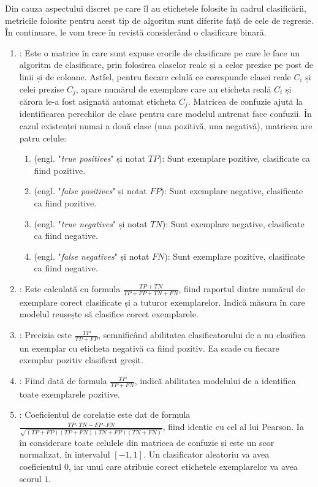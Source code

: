 \documentclass[../../main.tex]{subfiles}
\begin{document}
Din cauza aspectului discret pe care îl au etichetele folosite în cadrul clasifică\-rii, metricile folosite pentru acest tip de algoritm sunt diferite față de cele de regresie. În continuare, le vom trece în revistă considerând o clasificare binară.

\begin{enumerate}
    \item {}: Este o matrice în care sunt expuse erorile de clasificare pe care le face un algoritm de clasificare, prin folosirea claselor reale și a celor prezise pe post de linii și de coloane. Astfel, pentru fiecare celulă ce corespunde clasei reale $ C_i $ și celei prezise $ C_j $, apare numărul de exemplare care au eticheta reală $ C_i $ și cărora le-a fost asignată automat eticheta $ C_j $. Matricea de confuzie ajută la identificarea perechilor de clase pentru care modelul antrenat face confuzii. În cazul existenței numai a două clase (una pozitivă, una negativă), matricea are patru celule:
    \begin{enumerate}
        \item {} (engl. "\textit{true positives}" și notat $ TP $): Sunt exemplare pozitive, clasificate ca fiind pozitive.
        \item {} (engl. "\textit{false positives}" și notat $ FP $): Sunt exemplare negative, clasificate ca fiind pozitive.
        \item {} (engl. "\textit{true negatives}" și notat $ TN $): Sunt exemplare negative, clasificate ca fiind negative.
        \item {} (engl. "\textit{false negatives}" și notat $ FN $): Sunt exemplare pozitive, clasificate ca fiind negative.
    \end{enumerate}
    \item {}: Este calculată cu formula $ \frac{TP + TN}{TP + FP + TN + FN} $, fiind raportul dintre numărul de exemplare corect clasificate și a tuturor exemplarelor. Indică măsura în care modelul reușește să clasifice corect exemplarele.
    \item {}: Precizia este $ \frac{TP}{TP+FP} $, semnificând abilitatea clasificatorului de a nu clasifica un exemplar cu eticheta negativă ca fiind pozitiv. Ea scade cu fiecare exemplar pozitiv clasificat greșit.
    \item {}: Fiind dată de formula $ \frac{TP}{TP+FN} $, indică abilitatea modelului de a identifica toate exemplarele pozitive.
    \item {}: Coeficientul de corelație este dat de formula $ \frac{TP \cdot TN - FP \cdot FN}{\sqrt{(TP + FP)(TP + FN)(TN + FP)(TN + FN)}} $, fiind identic cu cel al lui Pearson. Ia în considerare toate celulele din matricea de confuzie și este un scor normalizat, în intervalul $ [-1, 1] $. Un clasificator aleatoriu va avea coeficientul $ 0 $, iar unul care atribuie corect etichetele exemplarelor va avea scorul $ 1 $.
\end{enumerate}
\end{document}
